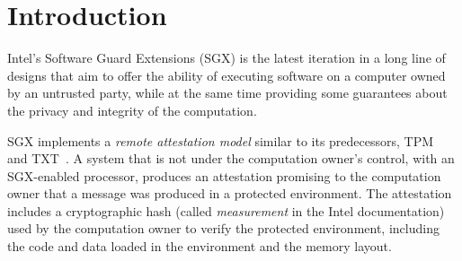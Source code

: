 \section{Introduction}
\label{sec:intro}

Intel's Software Guard Extensions (SGX) is the latest iteration in a long line
of designs that aim to offer the ability of executing software on a computer
owned by an untrusted party, while at the same time providing some guarantees
about the privacy and integrity of the computation.

SGX implements a \textit{remote attestation model} similar to its predecessors,
TPM~\cite{tpm} and TXT~\cite{grawrock2009txt}. A system that is not under the
computation owner's control, with an SGX-enabled processor, produces an
attestation promising to the computation owner that a message was produced in a
protected environment. The attestation includes a cryptographic hash
(called \textit{measurement} in the Intel documentation) used by the
computation owner to verify the protected environment, including the code and
data loaded in the environment and the memory layout.
